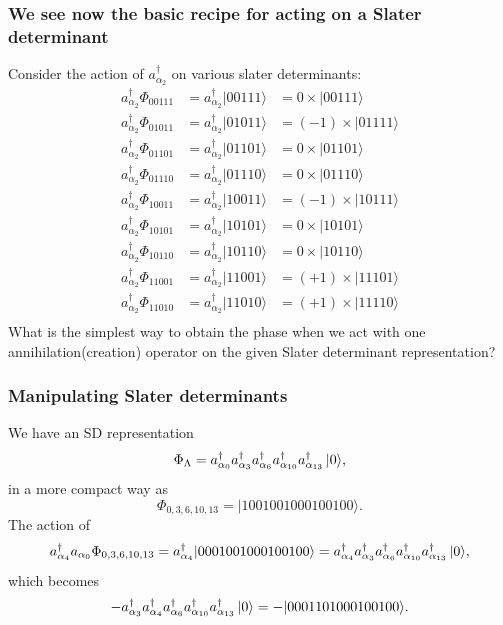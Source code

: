 \frame
{
  \frametitle{We see now the basic recipe for acting on a Slater determinant}
\begin{small}
{\scriptsize
Consider the action of $a^\dagger_{\alpha_2}$ on various slater determinants:
\[
\begin{array}{ccc}
a^\dagger_{\alpha_2}\Phi_{00111}& = a^\dagger_{\alpha_2}|00111\rangle&=0\times |00111\rangle\\
a^\dagger_{\alpha_2}\Phi_{01011}& = a^\dagger_{\alpha_2}|01011\rangle&=(-1)\times |01111\rangle\\
a^\dagger_{\alpha_2}\Phi_{01101}& = a^\dagger_{\alpha_2}|01101\rangle&=0\times |01101\rangle\\
a^\dagger_{\alpha_2}\Phi_{01110}& = a^\dagger_{\alpha_2}|01110\rangle&=0\times |01110\rangle\\
a^\dagger_{\alpha_2}\Phi_{10011}& = a^\dagger_{\alpha_2}|10011\rangle&=(-1)\times |10111\rangle\\
a^\dagger_{\alpha_2}\Phi_{10101}& = a^\dagger_{\alpha_2}|10101\rangle&=0\times |10101\rangle\\
a^\dagger_{\alpha_2}\Phi_{10110}& = a^\dagger_{\alpha_2}|10110\rangle&=0\times |10110\rangle\\
a^\dagger_{\alpha_2}\Phi_{11001}& = a^\dagger_{\alpha_2}|11001\rangle&=(+1)\times |11101\rangle\\
a^\dagger_{\alpha_2}\Phi_{11010}& = a^\dagger_{\alpha_2}|11010\rangle&=(+1)\times |11110\rangle\\
\end{array}
\]
What is the simplest way to obtain the phase when we act with one annihilation(creation) operator
on the given Slater determinant representation?
}
\end{small}
}


\frame
{
  \frametitle{Manipulating Slater determinants}
\begin{small}
{\scriptsize
We have an SD representation
\[
\Phi_{\Lambda} = a_{\alpha_0}^\dagger a_{\alpha_3}^\dagger a_{\alpha_6}^\dagger a_{\alpha_{10}}^\dagger a_{\alpha_{13}}^\dagger \,|{0}\rangle,
\]
in a more compact way as 
\[
\Phi_{0,3,6,10,13} = |1001001000100100\rangle.
\]
The action of 
\[
a^\dagger_{\alpha_4}a_{\alpha_0}\Phi_{0,3,6,10,13} = a^\dagger_{\alpha_4}|0001001000100100\rangle=a^\dagger_{\alpha_4}a_{\alpha_3}^\dagger a_{\alpha_6}^\dagger a_{\alpha_{10}}^\dagger a_{\alpha_{13}}^\dagger \,|{0}\rangle,
\]
which becomes
\[
-a_{\alpha_3}^\dagger a^\dagger_{\alpha_4} a_{\alpha_6}^\dagger a_{\alpha_{10}}^\dagger a_{\alpha_{13}}^\dagger \,|{0}\rangle=-|0001101000100100\rangle.
\]
}
\end{small}
}




